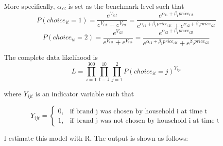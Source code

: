 \documentclass[12pt]{article}
\newenvironment{Question}[2][Question]{\begin{trivlist}
\item[\hskip \labelsep {\bfseries #1}\hskip \labelsep {\bfseries #2.}]}{\end{trivlist}}
\begin{document}
\begin{Question}{1}
 More specifically, $\alpha_{i2}$ is set as the benchmark level such that  
 \begin{equation*}
 P(choice_{it} = 1) = \frac{e^{ V_{i1t} }}{ e^{ V_{i1t} } + e^{ V_{i2t} }} = \frac{e^{ \alpha_{i1} + \beta_{1} price_{i1t}  }}{ e^{ \alpha_{i1} + \beta_{1} price_{i1t}  } + e^{ \alpha_{i2} + \beta_{1} price_{i2t}  }}
 \end{equation*}
 \begin{equation*}
P(choice_{it} = 2) = \frac{e^{ V_{i2t} }}{ e^{ V_{i1t} } + e^{ V_{i2t} }} = \frac{e^{ \alpha_{i2} + \beta_{1} price_{i2t}  }}{ e^{ \alpha_{i1} + \beta_{1} price_{i1t}  } + e^{ \beta_{1} price_{i2t}  }}
\end{equation*}
\end{Question}
 
\begin{Question}{2}
The complete data likelihood is 
\begin{equation*}
L = \prod\limits_{i=1}^{300} \prod\limits_{t=1}^{10} \prod\limits_{j=1}^2 { P(choice_{it} = j) } ^{Y_{ijt}}
\end{equation*}

where $Y_{ijt}$ is an indicator variable such that

\begin{equation*}
Y_{ijt}=
\begin{cases}
0, & \text{if brand j was chosen by household i at time t} \\
1, & \text{if brand j was not chosen by household i at time t}
\end{cases}
\end{equation*}

\end{Question}
 
\begin{Question}{3}
	I estimate this model with R. The output is shown as follows:
	
	
\end{Question}
 
 
\end{document}
